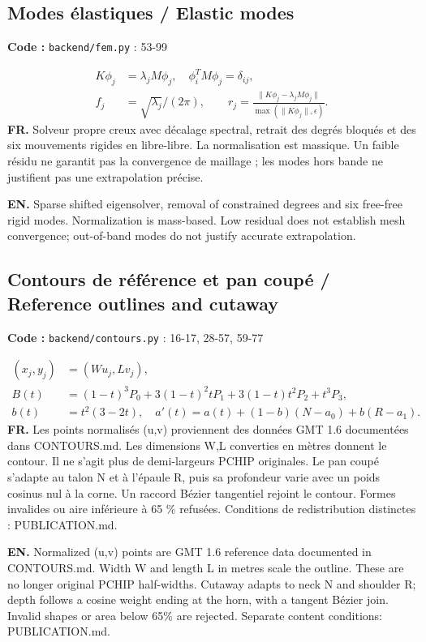 \documentclass[10pt,a4paper]{article}
\newcommand{\FR}[1]{\textbf{FR.} #1\par}\newcommand{\EN}[1]{{\selectlanguage{english}\textbf{EN.} #1\par}}
\newcommand{\loc}[1]{{\small\color{ink}\textbf{Code :} #1\par}}
\begin{document}
\begin{samepage}\subsection{Modes élastiques / Elastic modes}
\loc{\texttt{backend/fem.py} : 53-99}
\begin{align}K\phi_j&=\lambda_j M\phi_j,\quad\phi_i^TM\phi_j=\delta_{ij},\\
f_j&=\sqrt{\lambda_j}/(2\pi),\qquad r_j=\frac{\|K\phi_j-\lambda_jM\phi_j\|}{\max(\|K\phi_j\|,\epsilon)}.\end{align}
\FR{Solveur propre creux avec décalage spectral, retrait des degrés bloqués et des six mouvements rigides en libre-libre. La normalisation est massique. Un faible résidu ne garantit pas la convergence de maillage ; les modes hors bande ne justifient pas une extrapolation précise.}
\EN{Sparse shifted eigensolver, removal of constrained degrees and six free-free rigid modes. Normalization is mass-based. Low residual does not establish mesh convergence; out-of-band modes do not justify accurate extrapolation.}
\end{samepage}
\begin{samepage}\subsection{Contours de référence et pan coupé / Reference outlines and cutaway}
\loc{\texttt{backend/contours.py} : 16-17, 28-57, 59-77}
\begin{align}(x_j,y_j)&=(W u_j,L v_j),\\B(t)&=(1-t)^3P_0+3(1-t)^2tP_1+3(1-t)t^2P_2+t^3P_3,\\b(t)&=t^2(3-2t),\quad a\prime(t)=a(t)+(1-b)(N-a_0)+b(R-a_1).\end{align}
\FR{Les points normalisés (u,v) proviennent des données GMT 1.6 documentées dans CONTOURS.md. Les dimensions W,L converties en mètres donnent le contour. Il ne s’agit plus de demi-largeurs PCHIP originales. Le pan coupé s’adapte au talon N et à l’épaule R, puis sa profondeur varie avec un poids cosinus nul à la corne. Un raccord Bézier tangentiel rejoint le contour. Formes invalides ou aire inférieure à 65 \% refusées. Conditions de redistribution distinctes : PUBLICATION.md.}
\EN{Normalized (u,v) points are GMT 1.6 reference data documented in CONTOURS.md. Width W and length L in metres scale the outline. These are no longer original PCHIP half-widths. Cutaway adapts to neck N and shoulder R; depth follows a cosine weight ending at the horn, with a tangent Bézier join. Invalid shapes or area below 65\% are rejected. Separate content conditions: PUBLICATION.md.}
\end{samepage}
\end{document}
